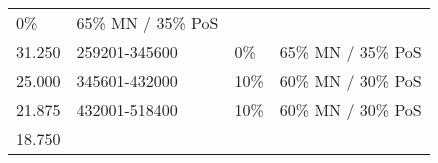 \documentclass[11pt,a4paperpaper,]{report}
\begin{document}
\begin{longtable}[c]{@{}llll@{}}
\begin{minipage}[t]{0.15\columnwidth}\raggedright\strut
0\%
\strut\end{minipage} &
\begin{minipage}[t]{0.27\columnwidth}\raggedright\strut
65\% MN / 35\% PoS
\strut\end{minipage}\tabularnewline
\begin{minipage}[t]{0.12\columnwidth}\raggedright\strut
31.250
\strut\end{minipage} &
\begin{minipage}[t]{0.22\columnwidth}\raggedright\strut
259201-345600
\strut\end{minipage} &
\begin{minipage}[t]{0.15\columnwidth}\raggedright\strut
0\%
\strut\end{minipage} &
\begin{minipage}[t]{0.27\columnwidth}\raggedright\strut
65\% MN / 35\% PoS
\strut\end{minipage}\tabularnewline
\begin{minipage}[t]{0.12\columnwidth}\raggedright\strut
25.000
\strut\end{minipage} &
\begin{minipage}[t]{0.22\columnwidth}\raggedright\strut
345601-432000
\strut\end{minipage} &
\begin{minipage}[t]{0.15\columnwidth}\raggedright\strut
10\%
\strut\end{minipage} &
\begin{minipage}[t]{0.27\columnwidth}\raggedright\strut
60\% MN / 30\% PoS
\strut\end{minipage}\tabularnewline
\begin{minipage}[t]{0.12\columnwidth}\raggedright\strut
21.875
\strut\end{minipage} &
\begin{minipage}[t]{0.22\columnwidth}\raggedright\strut
432001-518400
\strut\end{minipage} &
\begin{minipage}[t]{0.15\columnwidth}\raggedright\strut
10\%
\strut\end{minipage} &
\begin{minipage}[t]{0.27\columnwidth}\raggedright\strut
60\% MN / 30\% PoS
\strut\end{minipage}\tabularnewline
\begin{minipage}[t]{0.12\columnwidth}\raggedright\strut
18.750
\strut\end{minipage} &

\end{longtable}
\end{document}
